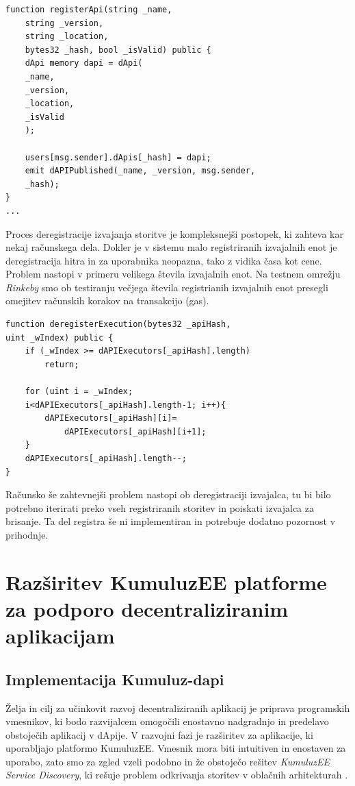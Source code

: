 \documentclass[a4paper, 12pt]{book}
\begin{document}
\begin{lstlisting}
function registerApi(string _name,
	string _version,
	string _location,
	bytes32 _hash, bool _isValid) public {
	dApi memory dapi = dApi(
	_name,
	_version,
	_location,
	_isValid
	);
	
	users[msg.sender].dApis[_hash] = dapi;
	emit dAPIPublished(_name, _version, msg.sender,
	_hash);
}
...
\end{lstlisting}

Proces deregistracije izvajanja storitve je kompleksnejši postopek, ki zahteva kar nekaj računskega dela.
Dokler je v sistemu malo registriranih izvajalnih enot je deregistracija hitra in za uporabnika neopazna, tako z vidika časa kot cene.
Problem nastopi v primeru velikega števila izvajalnih enot.
Na testnem omrežju \textit{Rinkeby} smo ob testiranju večjega števila registrianih izvajalnih enot presegli omejitev računskih korakov na transakcijo (gas).

\begin{lstlisting}
function deregisterExecution(bytes32 _apiHash, 
uint _wIndex) public {
	if (_wIndex >= dAPIExecutors[_apiHash].length)
		return;
	
	for (uint i = _wIndex;
	i<dAPIExecutors[_apiHash].length-1; i++){
		dAPIExecutors[_apiHash][i]=
			dAPIExecutors[_apiHash][i+1];
	}
	dAPIExecutors[_apiHash].length--;
}
\end{lstlisting}

Računsko še zahtevnejši problem nastopi ob deregistraciji izvajalca, tu bi bilo potrebno iterirati preko vseh registriranih storitev in poiskati izvajalca za brisanje.
Ta del registra še ni implementiran in potrebuje dodatno pozornost v prihodnje.


\section{Razširitev KumuluzEE platforme za podporo decentraliziranim aplikacijam}

\subsection{Implementacija Kumuluz-dapi}
Želja in cilj za učinkovit razvoj decentraliziranih aplikacij je priprava programskih vmesnikov, ki bodo razvijalcem omogočili enostavno nadgradnjo in predelavo obstoječih aplikacij v dApije.
V razvojni fazi je razširitev za aplikacije, ki uporabljajo platformo KumuluzEE.
Vmesnik mora biti intuitiven in enostaven za uporabo, zato smo za zgled vzeli podobno in že obstoječo rešitev \textit{KumuluzEE Service Discovery}, ki rešuje problem odkrivanja storitev v oblačnih arhitekturah \cite{maldip}.
\end{document}
